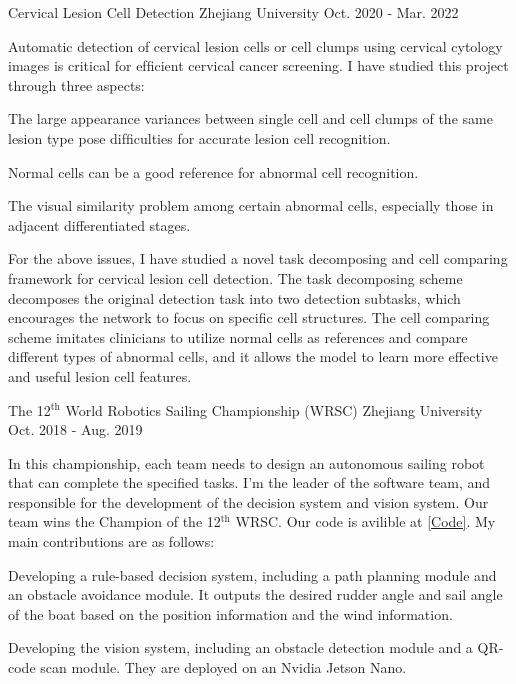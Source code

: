 \begin{cventries}
	\cventry
	{} %
	{Cervical Lesion Cell Detection} %
	{Zhejiang University} %
	{Oct. 2020 - Mar. 2022} %
	{
		Automatic detection of cervical lesion cells or cell clumps using cervical cytology images is critical for efﬁcient cervical cancer screening. I have studied this project through three aspects: \newline
		\vspace{4.5mm}
		\begin{cvitems} %
			\item{The large appearance variances between single cell and cell clumps of the same lesion type pose difﬁculties for accurate lesion cell recognition.}
			\item{Normal cells can be a good reference for abnormal cell recognition.}
			\item{The visual similarity problem among certain abnormal cells, especially those in adjacent differentiated stages.}
		\end{cvitems}
		\vspace{4.5mm}
		For the above issues, I have studied a novel task decomposing and cell comparing framework for cervical lesion cell detection. The task decomposing scheme decomposes the original detection task into two detection subtasks, which encourages the network to focus on specific cell structures. The cell comparing scheme imitates clinicians to utilize normal cells as references and compare different types of abnormal cells, and it allows the model to learn more effective and useful lesion cell features.
	}

	\cventry
	{} %
	{The 12$^\text{th}$ World Robotics Sailing Championship (WRSC)} %
	{Zhejiang University} %
	{Oct. 2018 - Aug. 2019} %
	{
		In this championship, each team needs to design an autonomous sailing robot that can complete the specified tasks. I'm the leader of the software team, and responsible for the development of the decision system and vision system. Our team wins the Champion of the 12$^\text{th}$ WRSC. Our code is avilible at \href{https://github.com/ZMART-Sailing/sailing_robot}{\textcolor{link}{[Code]}}.\newline
		My main contributions are as follows: \newline
		\vspace{3.5mm}
		\begin{cvitems} %
			\item{Developing a rule-based decision system, including a path planning module and an obstacle avoidance module. It outputs the desired rudder angle and sail angle of the boat based on the position information and the wind information.}
			\item{Developing the vision system, including an obstacle detection module and a QR-code scan module. They are deployed on an Nvidia Jetson Nano.}
		\end{cvitems}
	}


\end{cventries}
